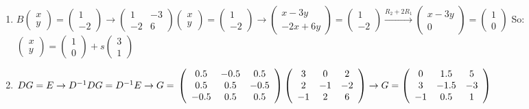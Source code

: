 \documentclass{article}
\begin{document}
\begin{enumerate}
\begin{enumerate}
\item
$
B \left(\begin{array}{c} x \\ y \end{array} \right) = \left(\begin{array}{c} 1 \\ -2 \end{array} \right)
\rightarrow
\left(\begin{array}{cc} 1 & -3 \\ -2 & 6 \end{array} \right) \left(\begin{array}{c} x \\ y \end{array} \right) = \left(\begin{array}{c} 1 \\ -2 \end{array} \right)
\rightarrow
\left(\begin{array}{c} x - 3y \\ -2x + 6y \end{array} \right) = \left(\begin{array}{c} 1 \\ -2 \end{array} \right)
\xrightarrow{R_2 + 2R_1} 
\left(\begin{array}{c} x - 3y \\ 0 \end{array} \right) =  \left(\begin{array}{c} 1 \\ 0 \end{array} \right)
$
So: 
$
\left(\begin{array}{c} x \\ y \end{array} \right) =  \left(\begin{array}{c} 1\\ 0 \end{array} \right) + s \left(\begin{array}{c} 3 \\ 1 \end{array} \right)
$

\item
$
DG = E
\rightarrow
D^{-1}DG = D^{-1}E
\rightarrow
G = \\
\left(\begin{array}{ccc} 0.5 & -0.5 & 0.5 \\ 0.5 & 0.5 & -0.5 \\ -0.5 & 0.5 & 0.5 \end{array} \right)
\left(\begin{array}{ccc} 3 & 0 & 2 \\ 2 & -1 & -2 \\ -1 & 2 & 6 \end{array} \right)
\rightarrow
G = \left(\begin{array}{ccc} 0 & 1.5 & 5 \\ 3 & -1.5 & -3 \\ -1 & 0.5 & 1 \end{array} \right)  
$
\end{enumerate}


\end{enumerate}
\end{document}
